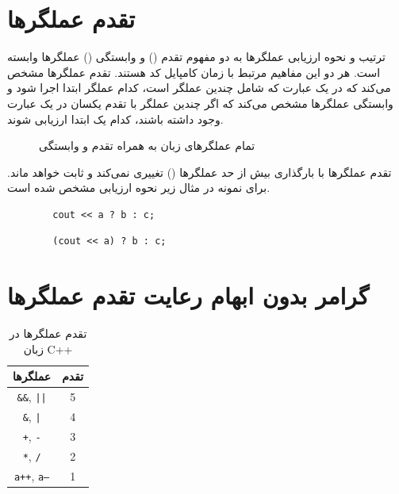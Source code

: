\documentclass[12pt, a4paper]{report}
\begin{document}
\section{تقدم عملگر‌ها}


ترتیب و نحوه ارزیابی عملگر‌ها به دو مفهوم تقدم () و وابستگی () عملگر‌ها 
وابسته است. هر دو این مفاهیم مرتبط با زمان کامپایل کد هستند.
تقدم عملگرها مشخص می‌کند که در یک عبارت که شامل چندین عملگر است، کدام عملگر ابتدا اجرا شود و وابستگی عملگرها مشخص می‌کند که اگر چندین عملگر با تقدم یکسان در یک عبارت وجود داشته باشند، کدام یک ابتدا ارزیابی شوند.

\begin{figure}[h!]
	\centering
	\caption{تمام عملگرهای زبان  به همراه تقدم و وابستگی}
	\label{fig:example}
\end{figure}

تقدم عملگر‌ها با بارگذاری بیش از حد عملگر‌ها () تغییری نمی‌کند و ثابت خواهد ماند.
برای نمونه در مثال زیر نحوه ارزیابی مشخص شده است.

\begin{LTR} %
	\begin{lstlisting}
		cout << a ? b : c;
	\end{lstlisting}
\end{LTR}

\begin{LTR} %
	\begin{lstlisting}
		(cout << a) ? b : c;
	\end{lstlisting}
\end{LTR}
\section{گرامر بدون ابهام رعایت تقدم عملگر‌ها}

\begin{table}[h!]
	\centering
	\begin{tabular}{|c|c|}
		\hline
		\textbf{عملگرها} & \textbf{تقدم} \\
		\hline
		\texttt{\&\&}, \texttt{||} & 5 \\
		\hline
		\texttt{\&}, \texttt{|} & 4 \\
		\hline
		\texttt{+}, \texttt{-} & 3 \\
		\hline
		\texttt{*}, \texttt{/} & 2 \\
		\hline
		\texttt{a++}, \texttt{a--} & 1 \\
		\hline
	\end{tabular}
	\caption{تقدم عملگرها در زبان C++}
	\label{tab:operator_precedence}
\end{table}
\end{document}
